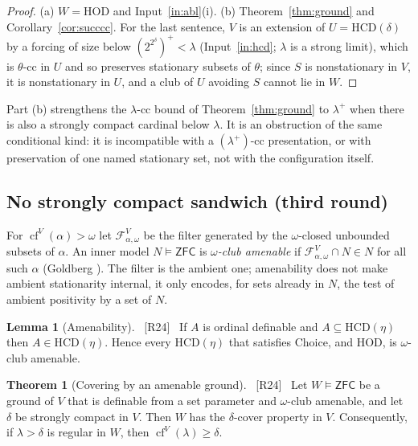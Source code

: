 \documentclass[11pt,letterpaper]{article}
\theoremstyle{definition}
\newtheorem{theorem}[definition]{Theorem}
\newtheorem{lemma}[definition]{Lemma}
\numberwithin{equation}{section}
\newcommand{\ZFC}{\mathsf{ZFC}}
\newcommand{\HOD}{\mathrm{HOD}}
\newcommand{\HCD}{\mathrm{HCD}}
\newcommand{\cf}{\operatorname{cf}}
\newcommand{\src}[1]{\unskip\ {\normalfont\small\sffamily\color{Olive}[#1]}\ }
\begin{document}
\begin{proof}
(a) $W=\HOD$ and Input~\ref{in:abl}(i). (b) Theorem~\ref{thm:ground} and Corollary~\ref{cor:succcc}. For the last sentence, $V$ is an extension of $U=\HCD(\delta)$ by a forcing of size below $(2^{2^\delta})^+<\lambda$ (Input~\ref{in:hcd}; $\lambda$ is a strong limit), which is $\theta$-cc in $U$ and so preserves stationary subsets of $\theta$; since $S$ is nonstationary in $V$, it is nonstationary in $U$, and a club of $U$ avoiding $S$ cannot lie in $W$.
\end{proof}

Part (b) strengthens the $\lambda$-cc bound of Theorem~\ref{thm:ground} to $\lambda^+$ when there is also a strongly compact cardinal below $\lambda$. It is an obstruction of the same conditional kind: it is incompatible with a $(\lambda^+)$-cc presentation, or with preservation of one named stationary set, not with the configuration itself.

\subsection{No strongly compact sandwich (third round)}\label{sec:sandwich}

For $\cf^V(\alpha)>\omega$ let $\mathcal F^V_{\alpha,\omega}$ be the filter generated by the $\omega$-closed unbounded subsets of $\alpha$. An inner model $N\models\ZFC$ is \emph{$\omega$-club amenable} if $\mathcal F^V_{\alpha,\omega}\cap N\in N$ for all such $\alpha$ (Goldberg \cite[\S2.2]{dichotomy}). The filter is the ambient one; amenability does not make ambient stationarity internal, it only encodes, for sets already in $N$, the test of ambient positivity by a set of $N$.

\begin{lemma}[Amenability]\label{lem:amenable}\src{R24}
If $A$ is ordinal definable and $A\subseteq\HCD(\eta)$ then $A\in\HCD(\eta)$. Hence every $\HCD(\eta)$ that satisfies Choice, and $\HOD$, is $\omega$-club amenable.
\end{lemma}

\begin{theorem}[Covering by an amenable ground]\label{thm:groundcover}\src{R24}
Let $W\models\ZFC$ be a ground of $V$ that is definable from a set parameter and $\omega$-club amenable, and let $\delta$ be strongly compact in $V$. Then $W$ has the $\delta$-cover property in $V$. Consequently, if $\lambda>\delta$ is regular in $W$, then $\cf^V(\lambda)\ge\delta$.
\end{theorem}
\end{document}
